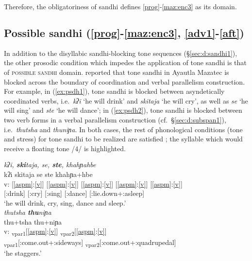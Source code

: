 \documentclass[output=paper]{langscibook}
\begin{document}
Therefore, the obligatoriness of sandhi defines \ref{prog}-\ref{maz:enc3} as its domain.


\subsection{Possible sandhi (\ref{prog}-\ref{maz:enc3}, \ref{adv1}-\ref{aft})} \label{sec:d:psandhi}
In addition to the disyllabic sandhi-blocking tone sequences (\S\ref{sec:d:sandhi1}), the other prosodic condition which impedes the application of tone sandhi is that of \textsc{possible sandhi} domain.
\citet[176--177]{nakamoto20} reported that tone sandhi in Ayautla Mazatec is blocked across the boundary of coordination and verbal parallelism construction. For example, in (\ref{ex:psdh1}), tone sandhi is blocked between asyndetically coordinated verbs, i.e.~\textit{k\lab{}ʔi\3\ff} `he will drink' and \textit{ski\1\ssn{}ta\2\st{}ja\4} `he will cry', as well as \textit{se\3\ff} `he will sing' and \textit{ste\1} `he will dance'; in (\ref{ex:psdh2}), tone sandhi is blocked between two verb forms in a verbal parallelism construction (cf.~\S\ref{sec:d:subspan1}), i.e.~\textit{thu\2tsha\3\ff} and \textit{thu\2ni\2ɲa\2}. In both cases, the rest of phonological conditions (tone and stress) for tone sandhi to be realized are satisfied \citep[cf.][180--184]{nakamoto20}; the syllable which would receive a floating tone /4/ is highlighted.

\ea \label{ex:psdh}
\ea \label{ex:psdh1} \textit{\st{}k\lab{}ʔi\3, \textbf{ski\1}\ssn{}ta\2\st{}ja\4, \st{}se\3, \textbf{\st{}ste\1}, k\lab{}ha\1hɲa\2\st{}hbe\4}\\
\glll {} k\lab{}ʔi\3\ff{} ski\1\ssn{}ta\2ja\4 se\3\ff{} ste\1 k\lab{}ha\1hɲa\2+hbe\4\\
v: [\ref{aspm}:\ref{v}] [\ref{aspm}:\ref{v}] [\ref{aspm}:\ref{v}] [\ref{aspm}:\ref{v}] [\ref{aspm}:\ref{v}]\\
{} [\Pot:drink] [\Pot:cry] [\Pot:sing] [\Pot:dance] [\Pot:lie.down+\Pos:asleep]\\
\glt `he will drink, cry, sing, dance and sleep.' \citep[176]{nakamoto20}\\
\ex\label{ex:psdh2} \textit{thu\2\st{}tsha\3 \textbf{thu\2}ni\2\st{}ɲa\2}\\
\glll {} thu\2+tsha\3\ff{} thu\2+ni\2ɲa\2\\
v: \textsubscript{vpar1}[\ref{aspm}:\ref{v}] \textsubscript{vpar2}[\ref{aspm}:\ref{v}]\\
{} \textsubscript{vpar1}[\Hab:come.out+\Pos:sideways] \textsubscript{vpar2}[\Hab:come.out+\Pos:quadrupedal]\\
\glt `he staggers.' \citep[177]{nakamoto20}
\z
\z
\end{document}
